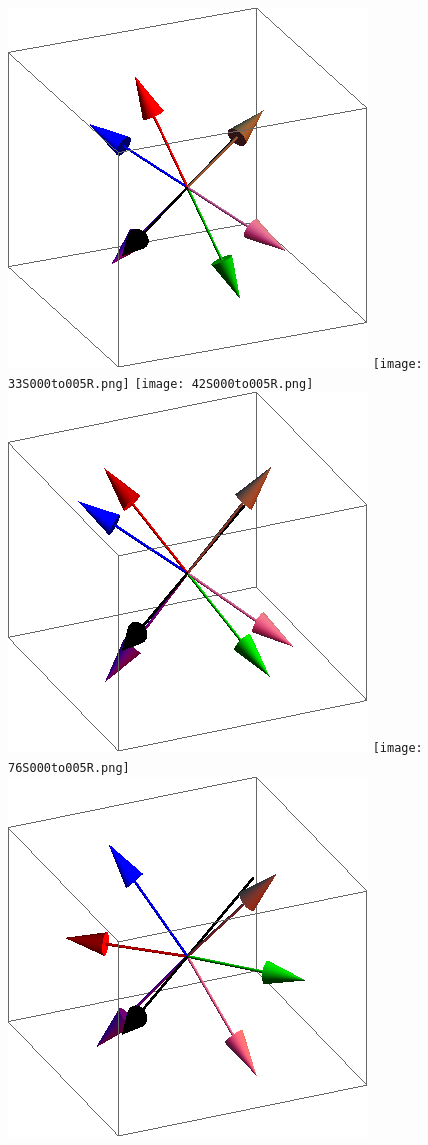 \documentclass{article}
\begin{document}
\begin{figure}[ht]
\centering
\includegraphics[scale=0.27]{1S000to005R.png}
\texttt{[image: 33S000to005R.png]}
\texttt{[image: 42S000to005R.png]}
\includegraphics[scale=0.27]{69S000to005R.png}
\texttt{[image: 76S000to005R.png]}
\includegraphics[scale=0.27]{82S000to005R.png}

\end{figure}
\end{document}
